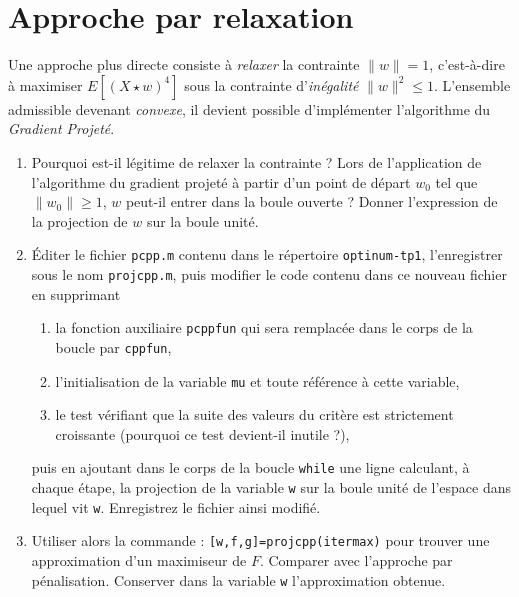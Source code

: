 \documentclass[10pt,a4paper,fleqn]{report}
\newcommand{\onit}{\begin{enumerate}}
\newcommand{\offit}{\end{enumerate}}
\renewcommand{\tt}{\texttt}
\begin{document}
\section{ Approche par relaxation}
Une approche plus directe consiste \`{a} \textit{relaxer} la contrainte $\| w\|=1$, c'est-\`{a}-dire \`{a} maximiser $E[(X\star w)^4]$ sous la contrainte d'\textit{in\'{e}galit\'{e}} $\| w \|^2 \leq 1$. L'ensemble admissible devenant \textit{convexe}, il devient possible d'impl\'{e}menter l'algorithme du \textit{Gradient Projet\'{e}}.
\onit
\item Pourquoi est-il légitime de relaxer la contrainte ? Lors de
  l'application de l'algorithme du gradient projeté à partir d'un
  point de départ $w_0$ tel que $\|w_0\| \geq 1$, $w$ peut-il entrer
  dans la boule ouverte ? Donner l'expression de la projection de $w$
  sur la boule unité.
\item \'Editer le fichier \tt{pcpp.m} contenu dans le r\'{e}pertoire \tt{optinum-tp1}, l'enregistrer sous le nom \tt{projcpp.m}, puis modifier le code contenu dans ce nouveau fichier en supprimant
\onit
\item la fonction auxiliaire \tt{pcppfun} qui sera remplac\'{e}e dans le corps de la boucle par \tt{cppfun},
\item l'initialisation de la variable \tt{mu} et toute r\'{e}f\'{e}rence \`{a} cette variable,
\item le test v\'{e}rifiant que la suite des valeurs du crit\`{e}re est strictement croissante (pourquoi ce test devient-il inutile ?),
\offit
puis en ajoutant dans le corps de la boucle \tt{while} une ligne calculant, \`{a} chaque \'{e}tape, la projection de la variable \tt w sur la boule unit\'{e} de l'espace dans lequel vit \tt w. Enregistrez le fichier ainsi modifi\'{e}.
\item Utiliser alors la commande : \tt{[w,f,g]=projcpp(itermax)} pour trouver une approximation
d'un maximiseur de $F$. Comparer avec l'approche par p\'{e}nalisation. Conserver
dans la variable \tt  w l'approximation obtenue.
\offit
\end{document}
